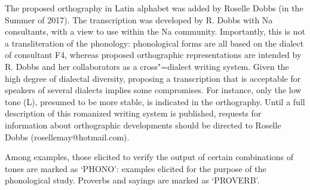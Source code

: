 The proposed orthography in Latin alphabet was added by Roselle Dobbs (in the Summer of 2017). The transcription was developed by R. Dobbs with Na consultants, with a view to use within the Na community. Importantly, this is not a transliteration of the phonology: phonological forms are all based on the dialect of consultant F4, whereas proposed orthographic representations are intended by R. Dobbs and her collaborators as a cross"=dialect writing system. Given the high degree of dialectal diversity, proposing a transcription that is acceptable for speakers of several dialects implies some compromises. For instance, only the low tone (L), presumed to be more stable, is indicated in the orthography. Until a full description of this romanized writing system is published, requests for information about orthographic developments should be directed to Roselle Dobbs (rosellemay@hotmail.com). 

Among examples, those elicited to verify the output of certain combinations of tones are marked as ‘PHONO': examples elicited for the purpose of the phonological study. Proverbs and sayings are marked as ‘PROVERB'.

